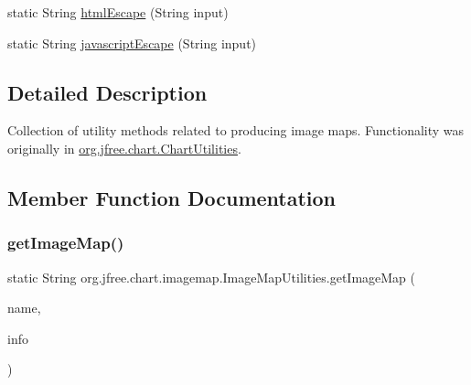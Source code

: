 \begin{DoxyCompactItemize}
\item 
static String \mbox{\hyperlink{classorg_1_1jfree_1_1chart_1_1imagemap_1_1_image_map_utilities_a964aecccbd94c9a11f97d0b4b5c1c2f6}{html\+Escape}} (String input)
\item 
static String \mbox{\hyperlink{classorg_1_1jfree_1_1chart_1_1imagemap_1_1_image_map_utilities_a809a6e13de23654665fa36f1a7a62e06}{javascript\+Escape}} (String input)
\end{DoxyCompactItemize}


\subsection{Detailed Description}
Collection of utility methods related to producing image maps. Functionality was originally in \mbox{\hyperlink{classorg_1_1jfree_1_1chart_1_1_chart_utilities}{org.\+jfree.\+chart.\+Chart\+Utilities}}. 

\subsection{Member Function Documentation}
\mbox{\label{classorg_1_1jfree_1_1chart_1_1imagemap_1_1_image_map_utilities_a7e478173f67d5bd55aee18f2e14d03c4}} 
\subsubsection{\texorpdfstring{get\+Image\+Map()}{getImageMap()}\hspace{0.1cm}{\footnotesize\ttfamily [1/2]}}
{\footnotesize\ttfamily static String org.\+jfree.\+chart.\+imagemap.\+Image\+Map\+Utilities.\+get\+Image\+Map (\begin{DoxyParamCaption}\item[{String}]{name,  }\item[{\mbox{\hyperlink{classorg_1_1jfree_1_1chart_1_1_chart_rendering_info}{Chart\+Rendering\+Info}}}]{info }\end{DoxyParamCaption})\hspace{0.3cm}{\ttfamily [static]}}

